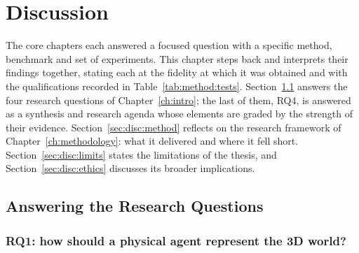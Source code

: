\chapter{Discussion}\label{ch:discussion}

The core chapters each answered a focused question with a specific method, benchmark and set of experiments. This chapter steps back and interprets their findings together, stating each at the fidelity at which it was obtained and with the qualifications recorded in Table~\ref{tab:method:tests}. Section~\ref{sec:disc:rq} answers the four research questions of Chapter~\ref{ch:intro}; the last of them, RQ4, is answered as a synthesis and research agenda whose elements are graded by the strength of their evidence. Section~\ref{sec:disc:method} reflects on the research framework of Chapter~\ref{ch:methodology}: what it delivered and where it fell short. Section~\ref{sec:disc:limits} states the limitations of the thesis, and Section~\ref{sec:disc:ethics} discusses its broader implications.

\section{Answering the Research Questions}\label{sec:disc:rq}

\subsection{RQ1: how should a physical agent represent the 3D world?}

